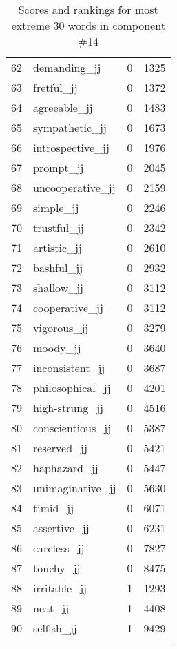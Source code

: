 \begin{longtable}[!htbp]{| rlr@{.}l |}
    62 & demanding\_jj & 0 & 1325 \\
    63 & fretful\_jj & 0 & 1372 \\
    64 & agreeable\_jj & 0 & 1483 \\
    65 & sympathetic\_jj & 0 & 1673 \\
    66 & introspective\_jj & 0 & 1976 \\
    67 & prompt\_jj & 0 & 2045 \\
    68 & uncooperative\_jj & 0 & 2159 \\
    69 & simple\_jj & 0 & 2246 \\
    70 & trustful\_jj & 0 & 2342 \\
    71 & artistic\_jj & 0 & 2610 \\
    72 & bashful\_jj & 0 & 2932 \\
    73 & shallow\_jj & 0 & 3112 \\
    74 & cooperative\_jj & 0 & 3112 \\
    75 & vigorous\_jj & 0 & 3279 \\
    76 & moody\_jj & 0 & 3640 \\
    77 & inconsistent\_jj & 0 & 3687 \\
    78 & philosophical\_jj & 0 & 4201 \\
    79 & high-strung\_jj & 0 & 4516 \\
    80 & conscientious\_jj & 0 & 5387 \\
    81 & reserved\_jj & 0 & 5421 \\
    82 & haphazard\_jj & 0 & 5447 \\
    83 & unimaginative\_jj & 0 & 5630 \\
    84 & timid\_jj & 0 & 6071 \\
    85 & assertive\_jj & 0 & 6231 \\
    86 & careless\_jj & 0 & 7827 \\
    87 & touchy\_jj & 0 & 8475 \\
    88 & irritable\_jj & 1 & 1293 \\
    89 & neat\_jj & 1 & 4408 \\
    90 & selfish\_jj & 1 & 9429 \\
    \hline
    \caption{Scores and rankings for most extreme 30 words in component \#14} \\
\end{longtable}
